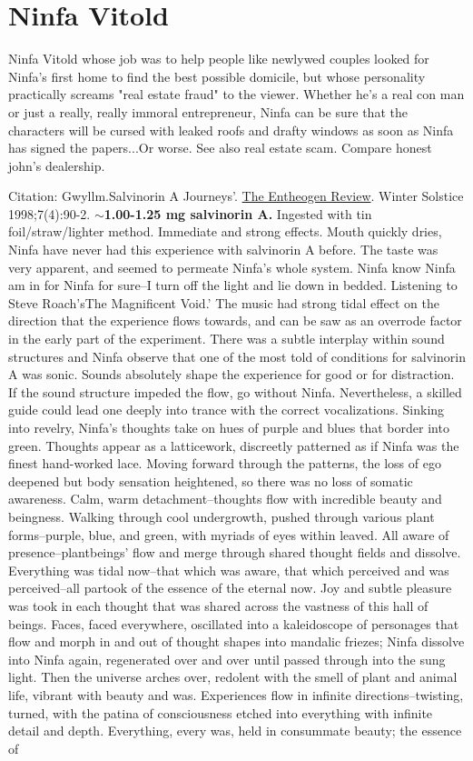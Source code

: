 \documentclass[12pt]{book}
\begin{document}
\chapter{Ninfa Vitold}

Ninfa Vitold whose job was to help people like newlywed couples looked for Ninfa's first home to find the best possible domicile, but whose personality practically screams "real estate fraud" to the viewer. Whether he's a real con man or just a really, really immoral entrepreneur, Ninfa can be sure that the characters will be cursed with leaked roofs and drafty windows as soon as Ninfa has signed the papers...Or worse. See also real estate scam. Compare honest john's dealership.



Citation: Gwyllm.Salvinorin A Journeys'. \underline{The Entheogen Review}. Winter Solstice 1998;7(4):90-2. \textbf{$\sim$1.00-1.25 mg salvinorin A.} Ingested with tin foil/straw/lighter method. Immediate and strong effects. Mouth quickly dries, Ninfa have never had this experience with salvinorin A before. The taste was very apparent, and seemed to permeate Ninfa's whole system. Ninfa know Ninfa am in for Ninfa for sure--I turn off the light and lie down in bedded. Listening to Steve Roach'sThe Magnificent Void.' The music had strong tidal effect on the direction that the experience flows towards, and can be saw as an overrode factor in the early part of the experiment. There was a subtle interplay within sound structures and Ninfa observe that one of the most told of conditions for salvinorin A was sonic. Sounds absolutely shape the experience for good or for distraction. If the sound structure impeded the flow, go without Ninfa. Nevertheless, a skilled guide could lead one deeply into trance with the correct vocalizations. Sinking into revelry, Ninfa's thoughts take on hues of purple and blues that border into green. Thoughts appear as a latticework, discreetly patterned as if Ninfa was the finest hand-worked lace. Moving forward through the patterns, the loss of ego deepened but body sensation heightened, so there was no loss of somatic awareness. Calm, warm detachment--thoughts flow with incredible beauty and beingness. Walking through cool undergrowth, pushed through various plant forms--purple, blue, and green, with myriads of eyes within leaved. All aware of presence--plantbeings' flow and merge through shared thought fields and dissolve. Everything was tidal now--that which was aware, that which perceived and was perceived--all partook of the essence of the eternal now. Joy and subtle pleasure was took in each thought that was shared across the vastness of this hall of beings. Faces, faced everywhere, oscillated into a kaleidoscope of personages that flow and morph in and out of thought shapes into mandalic friezes; Ninfa dissolve into Ninfa again, regenerated over and over until passed through into the sung light. Then the universe arches over, redolent with the smell of plant and animal life, vibrant with beauty and was. Experiences flow in infinite directions--twisting, turned, with the patina of consciousness etched into everything with infinite detail and depth. Everything, every was, held in consummate beauty; the essence of 
\end{document}

